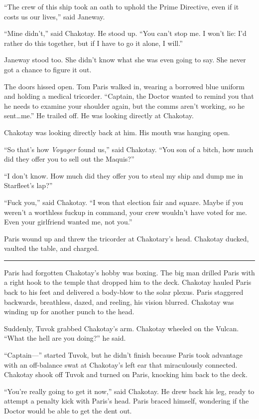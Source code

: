 \documentclass[twoside,letterpaper,12pt]{memoir}
\begin{document}
``The crew of this ship took an oath to uphold the Prime Directive, even if it costs us our lives,'' said Janeway.

``Mine didn't,'' said Chakotay. He stood up. ``You can't stop me. I won't lie: I'd rather do this together, but if I have to go it alone, I will.''

Janeway stood too. She didn't know what she was even going to say. She never got a chance to figure it out.

The doors hissed open. Tom Paris walked in, wearing a borrowed blue uniform and holding a medical tricorder. ``Captain, the Doctor wanted to remind you that he needs to examine your shoulder again, but the comms aren't working, so he sent\ldots me.'' He trailed off. He was looking directly at Chakotay.

Chakotay was looking directly back at him. His mouth was hanging open.

``So that's how \textit{Voyager} found us,'' said Chakotay. ``You son of a bitch, how much did they offer you to sell out the Maquis?''

``I don't know. How much did they offer you to steal my ship and dump me in Starfleet's lap?''

``Fuck you,'' said Chakotay. ``I won that election fair and square. Maybe if you weren't a worthless fuckup in command, your crew wouldn't have voted for me. Even your girlfriend wanted me, not you.''

Paris wound up and threw the tricorder at Chakotary's head. Chakotay ducked, vaulted the table, and charged.

\fancybreak{\rule{3cm}{0.4 pt}}
Paris had forgotten Chakotay's hobby was boxing. The big man drilled Paris with a right hook to the temple that dropped him to the deck. Chakotay hauled Paris back to his feet and delivered a body-blow to the solar plexus. Paris staggered backwards, breathless, dazed, and reeling, his vision blurred. Chakotay was winding up for another punch to the head.

Suddenly, Tuvok grabbed Chakotay's arm. Chakotay wheeled on the Vulcan. ``What the hell are you doing?'' he said.

``Captain---'' started Tuvok, but he didn't finish because Paris took advantage with an off-balance swat at Chakotay's left ear that miraculously connected. Chakotay shook off Tuvok and turned on Paris, knocking him back to the deck.

``You're really going to get it now,'' said Chakotay. He drew back his leg, ready to attempt a penalty kick with Paris's head. Paris braced himself, wondering if the Doctor would be able to get the dent out.
\end{document}
